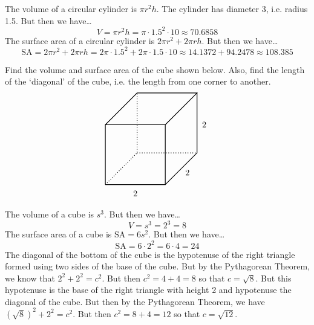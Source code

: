 \documentclass[11pt,letterpaper]{article}
\begin{document}
\sol The volume of a circular cylinder is $\pi r^2 h$. The cylinder has diameter 3, i.e. radius 1.5. But then we have\dots
	\[
	V= \pi r^2h= \pi \cdot 1.5^2 \cdot 10 \approx 70.6858
	\]
The surface area of a circular cylinder is $2\pi r^2 + 2\pi r h$. But then we have\dots
	\[
	\text{SA}= 2\pi r^2 + 2\pi r h= 2 \pi \cdot 1.5^2 + 2 \pi \cdot 1.5 \cdot 10 \approx 14.1372 + 94.2478 \approx 108.385
	\]



\newpage



 Find the volume and surface area of the cube shown below. Also, find the length of the `diagonal' of the cube, i.e. the length from one corner to another. 
 	\[
	\begin{tikzpicture}[scale=2.5]
	\draw[line width=0.03cm] (0,0) -- (1,0) -- (1,1) -- (0,1) -- (0,0);
	\draw[line width=0.03cm] (0,1) -- (0.53,1.53) -- (1.53,1.53) -- (1,1);
	\draw[line width=0.03cm] (1.53,1.53) -- (1.53,0.53) -- (1,0);
	\draw[line width=0.03cm, dotted] (0,0) -- (0.53,0.53) -- (0.53,1.53);
	\draw[line width=0.03cm, dotted] (0.53,0.53) -- (1.53,0.53);
	\node at (0.5,-0.15) {$2$};
	\node at (1.37,0.2) {$2$};
	\node at (1.65,1) {$2$};
	\end{tikzpicture}
	\] \pspace

\sol The volume of a cube is $s^3$. But then we have\dots
	\[
	V= s^3= 2^3= 8
	\]
The surface area of a cube is $\text{SA}= 6s^2$. But then we have\dots
	\[
	\text{SA}= 6 \cdot 2^2= 6 \cdot 4= 24
	\]
The diagonal of the bottom of the cube is the hypotenuse of the right triangle formed using two sides of the base of the cube. But by the Pythagorean Theorem, we know that $2^2 + 2^2= c^2$. But then $c^2= 4 + 4= 8$ so that $c= \sqrt{8}$. But this hypotenuse is the base of the right triangle with height 2 and hypotenuse the diagonal of the cube. But then by the Pythagorean Theorem, we have $(\sqrt{8})^2 + 2^2= c^2$. But then $c^2= 8 + 4= 12$ so that $c= \sqrt{12}$. 
\end{document}
